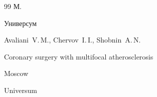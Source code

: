 \begin{thebibliography}{99}
\publaddr М.


\publ Универсум


\misctransl

\by Avaliani~V.\,M., Chervov~I.\,I., Shobnin~A.\,N.

\book  Coronary surgery with multifocal atherosclerosis

\publaddr Moscow


\publ Universum 






\end{thebibliography}



\noindent

\hskip6.5cm \thedate \par\noindent

\hskip6.5cm\therevdate



%









\makeengtitlem







 \newpage

%



%

